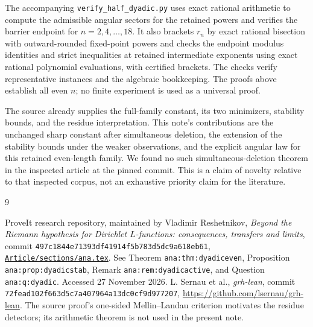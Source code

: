 \documentclass[11pt]{article}
\begin{document}
The accompanying \texttt{verify\_half\_dyadic.py} uses exact rational arithmetic to compute the admissible angular sectors for the retained powers and verifies the barrier endpoint for $n=2,4,\ldots,18$. It also brackets $r_n$ by exact rational bisection with outward-rounded fixed-point powers and checks the endpoint modulus identities and strict inequalities at retained intermediate exponents using exact rational polynomial evaluations, with certified brackets. The checks verify representative instances and the algebraic bookkeeping. The proofs above establish all even $n$; no finite experiment is used as a universal proof.

The source already supplies the full-family constant, its two minimizers, stability bounds, and the residue interpretation. This note's contributions are the unchanged sharp constant after simultaneous deletion, the extension of the stability bounds under the weaker observations, and the explicit angular law for this retained even-length family. We found no such simultaneous-deletion theorem in the inspected article at the pinned commit. This is a claim of novelty relative to that inspected corpus, not an exhaustive priority claim for the literature.

\begin{thebibliography}{9}
\raggedright
{}
ProveIt research repository, maintained by Vladimir Reshetnikov, \emph{Beyond the Riemann hypothesis for Dirichlet $L$-functions: consequences, transfers and limits}, commit
\texttt{497c1844e71393df41914f5b783d5dc9a618eb61},
\href{https://github.com/VladimirReshetnikov/ProveIt/blob/497c1844e71393df41914f5b783d5dc9a618eb61/Analysis/GeneralizedRiemannHypothesis/Article/sections/ana.tex}{\texttt{Article/sections/ana.tex}}.
See Theorem \texttt{ana:thm:dyadiceven}, Proposition \texttt{ana:prop:dyadicstab}, Remark \texttt{ana:rem:dyadicactive}, and Question \texttt{ana:q:dyadic}. Accessed 27 November 2026.
L. Sernau et al., \emph{grh-lean}, commit
\texttt{72fead102f663d5c7a407964a13dc0cf9d977207},
\url{https://github.com/lsernau/grh-lean}.
The source proof's one-sided Mellin--Landau criterion motivates the residue detectors; its arithmetic theorem is not used in the present note.
\end{thebibliography}
\end{document}
